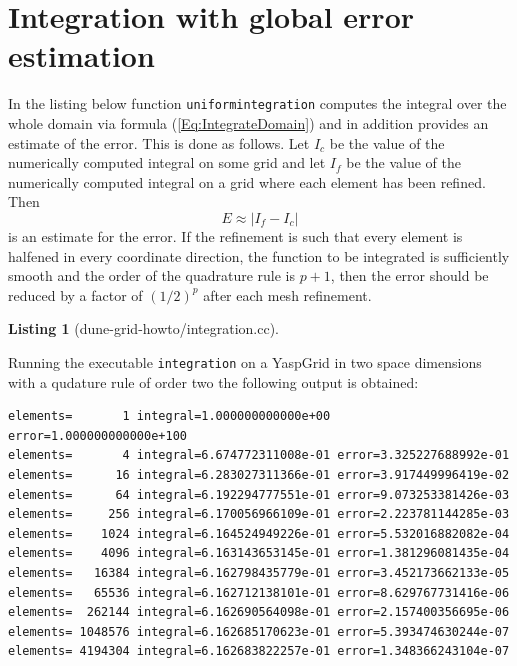 \documentclass[11pt,a4paper,headinclude,footinclude,DIV16,normalheadings]{scrreprt}
\newtheorem{lst}{Listing}
\begin{document}
\section{Integration with global error estimation}

In the listing below function \lstinline!uniformintegration!
computes the integral over the whole domain via formula
(\ref{Eq:IntegrateDomain}) and in addition provides an estimate of the
error. This is done as follows. Let $I_c$ be the value of the numerically
computed integral on some grid and let $I_f$ be the value of the
numerically computed integral on a grid where each element has been
refined. Then 
\begin{equation}
\label{Eq:GlobalError}
E \approx |I_f-I_c|
\end{equation}
is an estimate for the error. If
the refinement is such that every element is halfened in every
coordinate direction, the function to be integrated is sufficiently
smooth and the order of the quadrature rule is $p+1$,
then the error should be reduced by a factor of $(1/2)^p$ after
each mesh refinement. 

\begin{lst}[dune-grid-howto/integration.cc] \mbox{}


\end{lst}

Running the executable \lstinline!integration! on a YaspGrid in two
space dimensions with a qudature rule of order
two the following output is obtained:

\begin{lstlisting}[basicstyle=\ttfamily\scriptsize]
elements=       1 integral=1.000000000000e+00 error=1.000000000000e+100
elements=       4 integral=6.674772311008e-01 error=3.325227688992e-01
elements=      16 integral=6.283027311366e-01 error=3.917449996419e-02
elements=      64 integral=6.192294777551e-01 error=9.073253381426e-03
elements=     256 integral=6.170056966109e-01 error=2.223781144285e-03
elements=    1024 integral=6.164524949226e-01 error=5.532016882082e-04
elements=    4096 integral=6.163143653145e-01 error=1.381296081435e-04
elements=   16384 integral=6.162798435779e-01 error=3.452173662133e-05
elements=   65536 integral=6.162712138101e-01 error=8.629767731416e-06
elements=  262144 integral=6.162690564098e-01 error=2.157400356695e-06
elements= 1048576 integral=6.162685170623e-01 error=5.393474630244e-07
elements= 4194304 integral=6.162683822257e-01 error=1.348366243104e-07
\end{lstlisting}
\end{document}
